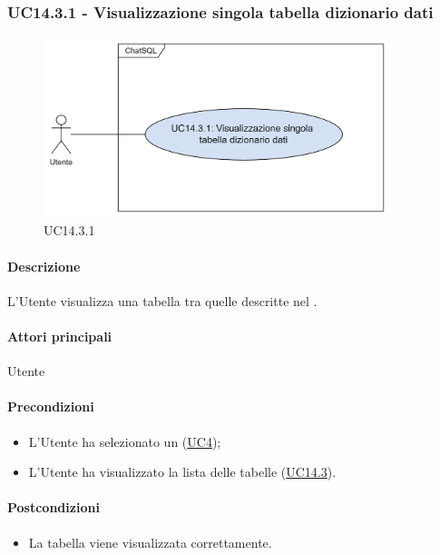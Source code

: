 
\subsubsection{UC14.3.1 - Visualizzazione singola tabella dizionario dati}\label{UC14point3point1}

\begin{figure}[H]
  \centering
  \includegraphics[width=0.90\textwidth]{assets/uc14_3_1.png}
  \caption{UC14.3.1}
\end{figure}

\paragraph*{Descrizione}
L'Utente visualizza una tabella tra quelle descritte nel .

\paragraph*{Attori principali}
Utente

\paragraph*{Precondizioni}
\begin{itemize}
  \item L'Utente ha selezionato un  (\hyperref[UC4]{UC4});
  \item L'Utente ha visualizzato la lista delle tabelle (\hyperref[UC14point3]{UC14.3}).
\end{itemize}

\paragraph*{Postcondizioni}
\begin{itemize}
  \item La tabella viene visualizzata correttamente.
\end{itemize}

